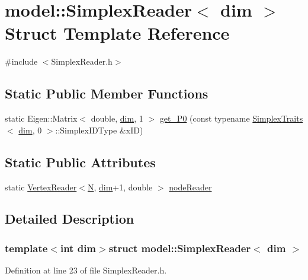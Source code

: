 \hypertarget{structmodel_1_1_simplex_reader}{}\section{model\+:\+:Simplex\+Reader$<$ dim $>$ Struct Template Reference}
\label{structmodel_1_1_simplex_reader}


{\ttfamily \#include $<$Simplex\+Reader.\+h$>$}

\subsection*{Static Public Member Functions}
\begin{DoxyCompactItemize}
\item 
static Eigen\+::\+Matrix$<$ double, \hyperlink{plot_nd_a_8m_a382f3ca768b275b8d563604f7fc7df73}{dim}, 1 $>$ \hyperlink{structmodel_1_1_simplex_reader_ae37c835f8b7f3156ee4ebfc8e4ef9608}{get\+\_\+\+P0} (const typename \hyperlink{structmodel_1_1_simplex_traits}{Simplex\+Traits}$<$ \hyperlink{plot_nd_a_8m_a382f3ca768b275b8d563604f7fc7df73}{dim}, 0 $>$\+::Simplex\+I\+D\+Type \&x\+I\+D)
\end{DoxyCompactItemize}
\subsection*{Static Public Attributes}
\begin{DoxyCompactItemize}
\item 
static \hyperlink{classmodel_1_1_vertex_reader}{Vertex\+Reader}$<$\textquotesingle{}\hyperlink{thompson__tetrahedron_8m_a7823765a845eb81829f110d8337f81ae}{N}\textquotesingle{}, \hyperlink{plot_nd_a_8m_a382f3ca768b275b8d563604f7fc7df73}{dim}+1, double $>$ \hyperlink{structmodel_1_1_simplex_reader_ad0d298530d73cd3e6afef3a3941af710}{node\+Reader}
\end{DoxyCompactItemize}


\subsection{Detailed Description}
\subsubsection*{template$<$int dim$>$struct model\+::\+Simplex\+Reader$<$ dim $>$}



Definition at line 23 of file Simplex\+Reader.\+h.



